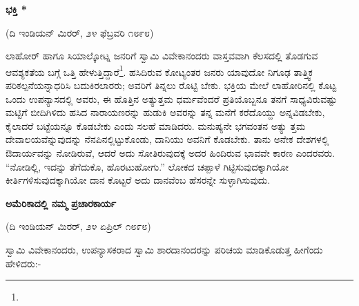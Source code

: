 \begin{center}
\textbf{ಭಕ್ತಿ *}
\end{center}

\begin{center}
(ದಿ ಇಂಡಿಯನ್ ಮಿರರ್, ೨೪ ಫೆಬ್ರವರಿ ೧೮೯೮)
\end{center}

ಲಾಹೋರ್ ಹಾಗೂ ಸಿಯಾಲ್ಕೋಟ್ನ ಜನರಿಗೆ ಸ್ವಾಮಿ ವಿವೇಕಾನಂದರು ವಾಸ್ತವವಾಗಿ ಕೆಲಸದಲ್ಲಿ ತೊಡಗುವ ಆವಶ್ಯಕತೆಯ ಬಗ್ಗೆ ಒತ್ತಿ ಹೇಳುತ್ತಿದ್ದಾರೆ\footnote{}. ಹಸಿದಿರುವ ಕೋಟ್ಯಂತರ ಜನರು ಯಾವುದೋ ನಿಗೂಢ ತಾತ್ತ್ವಿಕ ಪರಿಕಲ್ಪನೆಯನ್ನಾಧರಿಸಿ ಬದುಕಿರಲಾರರು; ಅವರಿಗೆ ತಿನ್ನಲು ರೊಟ್ಟಿ ಬೇಕು. ಭಕ್ತಿಯ ಮೇಲೆ ಲಾಹೋರಿನಲ್ಲಿ ಕೊಟ್ಟ ಒಂದು ಉಪನ್ಯಾಸದಲ್ಲಿ ಅವರು, ಈ ಹೊತ್ತಿನ ಅತ್ಯುತ್ತಮ ಧರ್ಮವೆಂದರೆ ಪ್ರತಿಯೊಬ್ಬನೂ ತನಗೆ ಸಾಧ್ಯವಿರುವಷ್ಟು ಮಟ್ಟಿಗೆ ಬೀದಿಗಿಳಿದು ಹಸಿದ ನಾರಾಯಣರನ್ನು ಹುಡುಕಿ ಅವರನ್ನು ತನ್ನ ಮನೆಗೆ ಕರೆದೊಯ್ದು ಅನ್ನವಿಡಬೇಕು, ಕೈಲಾದರೆ ಬಟ್ಟೆಯನ್ನೂ ಕೊಡಬೇಕು ಎಂದು ಸಲಹೆ ಮಾಡಿದರು. ಮನುಷ್ಯನೇ ಭಗವಂತನ ಅತ್ಯು ತ್ತಮ ದೇವಾಲಯವೆನ್ನುವುದನ್ನು ನೆನಪಿನಲ್ಲಿಟ್ಟುಕೊಂಡು, ದಾನಿಯು ಅವನಿಗೆ ಕೊಡಬೇಕು. ತಾನು ಅನೇಕ ದೇಶಗಳಲ್ಲಿ ಔದಾರ್ಯವನ್ನು ನೋಡಿರುವೆ, ಆದರೆ ಅದು ಸೋತಿರುವುದಕ್ಕೆ ಅದರ ಹಿಂದಿರುವ ಭಾವವೇ ಕಾರಣ ಎಂದರವರು. “ನೋಡಿಲ್ಲಿ, ಇದನ್ನು ತೆಗೆದುಕೊ, ಹೊರಟುಹೋಗು.” ಲೋಕದ ಚಪ್ಪಾಳೆ ಗಿಟ್ಟಿಸುವುದಕ್ಕಾಗಿಯೋ ಕೀರ್ತಿಗಳಿಸುವುದಕ್ಕಾಗಿಯೋ ದಾನ ಕೊಟ್ಟರೆ ಅದು ದಾನವೆಂಬ ಹೆಸರನ್ನೇ ಸುಳ್ಳಾಗಿಸುವುದು.

\begin{center}
\textbf{ಅಮೆರಿಕಾದಲ್ಲಿ ನಮ್ಮ ಪ್ರಚಾರಕಾರ್ಯ}
\end{center}

\begin{center}
(ದಿ ಇಂಡಿಯನ್ ಮಿರರ್, ೨೪ ಏಪ್ರಿಲ್ ೧೮೯೮)
\end{center}

ಸ್ವಾಮಿ ವಿವೇಕಾನಂದರು, ಉಪನ್ಯಾಸಕರಾದ ಸ್ವಾಮಿ ಶಾರದಾನಂದರನ್ನು ಪರಿಚಯ ಮಾಡಿಕೊಡುತ್ತ ಹೀಗೆಂದು ಹೇಳಿದರು:-

